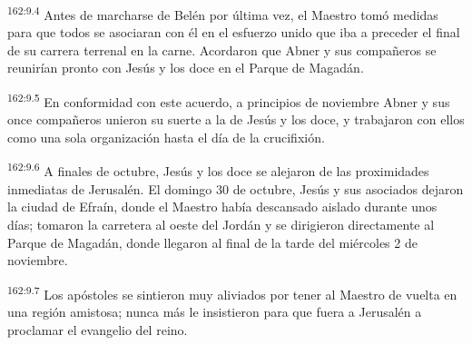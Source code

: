 \par 
\textsuperscript{162:9.4} Antes de marcharse de Belén por última vez, el Maestro tomó medidas para que todos se asociaran con él en el esfuerzo unido que iba a preceder el final de su carrera terrenal en la carne. Acordaron que Abner y sus compañeros se reunirían pronto con Jesús y los doce en el Parque de Magadán.

\par 
\textsuperscript{162:9.5} En conformidad con este acuerdo, a principios de noviembre Abner y sus once compañeros unieron su suerte a la de Jesús y los doce, y trabajaron con ellos como una sola organización hasta el día de la crucifixión.

\par 
\textsuperscript{162:9.6} A finales de octubre, Jesús y los doce se alejaron de las proximidades inmediatas de Jerusalén. El domingo 30 de octubre, Jesús y sus asociados dejaron la ciudad de Efraín, donde el Maestro había descansado aislado durante unos días; tomaron la carretera al oeste del Jordán y se dirigieron directamente al Parque de Magadán, donde llegaron al final de la tarde del miércoles 2 de noviembre.

\par 
\textsuperscript{162:9.7} Los apóstoles se sintieron muy aliviados por tener al Maestro de vuelta en una región amistosa; nunca más le insistieron para que fuera a Jerusalén a proclamar el evangelio del reino.